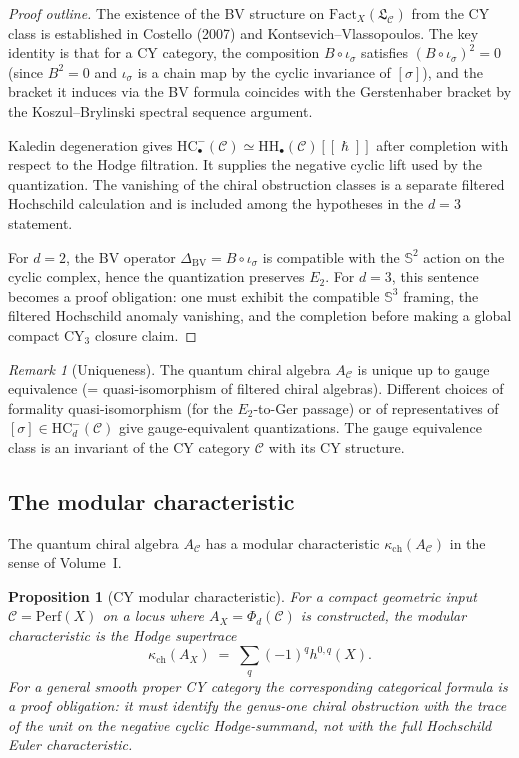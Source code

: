 \documentclass[11pt]{article}
\theoremstyle{plain}
\newtheorem{proposition}[theorem]{Proposition}
\theoremstyle{definition}
\theoremstyle{remark}
\newtheorem{remark}[theorem]{Remark}
\newcommand{\Etwo}{E_2}
\newcommand{\HH}{\mathrm{HH}}
\newcommand{\HC}{\mathrm{HC}}
\newcommand{\Fact}{\mathrm{Fact}}
\newcommand{\Ger}{\mathrm{Ger}}
\newcommand{\BV}{\mathrm{BV}}
\newcommand{\Perf}{\mathrm{Perf}}
\newcommand{\cC}{\mathcal{C}}
\newcommand{\frakL}{\mathfrak{L}}
\providecommand{\hbar}{\hslash}
\begin{document}
\begin{proof}[Proof outline]
The existence of the BV structure on $\Fact_X(\frakL_\cC)$ from the CY class is established in Costello (2007) and Kontsevich--Vlassopoulos. The key identity is that for a CY category, the composition $B \circ \iota_\sigma$ satisfies $(B \circ \iota_\sigma)^2 = 0$ (since $B^2 = 0$ and $\iota_\sigma$ is a chain map by the cyclic invariance of $[\sigma]$), and the bracket it induces via the BV formula coincides with the Gerstenhaber bracket by the Koszul--Brylinski spectral sequence argument.

Kaledin degeneration gives $\HC^-_\bullet(\cC) \simeq
\HH_\bullet(\cC)[[\hbar]]$ after completion with respect to the Hodge
filtration. It supplies the negative cyclic lift used by the
quantization. The vanishing of the chiral obstruction classes is a
separate filtered Hochschild calculation and is included among the
hypotheses in the $d=3$ statement.

For $d=2$, the BV operator $\Delta_{\BV} = B \circ \iota_\sigma$ is
compatible with the $\mathbb{S}^2$ action on the cyclic complex, hence
the quantization preserves $\Etwo$. For $d=3$, this sentence becomes a
proof obligation: one must exhibit the compatible $\mathbb{S}^3$
framing, the filtered Hochschild anomaly vanishing, and the completion
before making a global compact CY$_3$ closure claim.
\end{proof}

\begin{remark}[Uniqueness]
\label{rem:uniqueness}
The quantum chiral algebra $A_\cC$ is unique up to gauge equivalence (= quasi-isomorphism of filtered chiral algebras). Different choices of formality quasi-isomorphism (for the $\Etwo$-to-$\Ger$ passage) or of representatives of $[\sigma] \in \HC^-_d(\cC)$ give gauge-equivalent quantizations. The gauge equivalence class is an invariant of the CY category $\cC$ with its CY structure.
\end{remark}

\subsection{The modular characteristic}
\label{sec:modular-char}

The quantum chiral algebra $A_\cC$ has a modular characteristic $\kappa_{\mathrm{ch}}(A_\cC)$ in the sense of Volume~I.

\begin{proposition}[CY modular characteristic]
\label{prop:cy-kappa}
For a compact geometric input $\cC=\Perf(X)$ on a locus where
$A_X=\Phi_d(\cC)$ is constructed, the modular characteristic is the
Hodge supertrace
\[
\kappa_{\mathrm{ch}}(A_X)
\;=\;
\sum_q (-1)^q h^{0,q}(X).
\]
For a general smooth proper CY category the corresponding categorical
formula is a proof obligation: it must identify the genus-one chiral
obstruction with the trace of the unit on the negative cyclic
Hodge-summand, not with the full Hochschild Euler characteristic.
\end{proposition}
\end{document}
